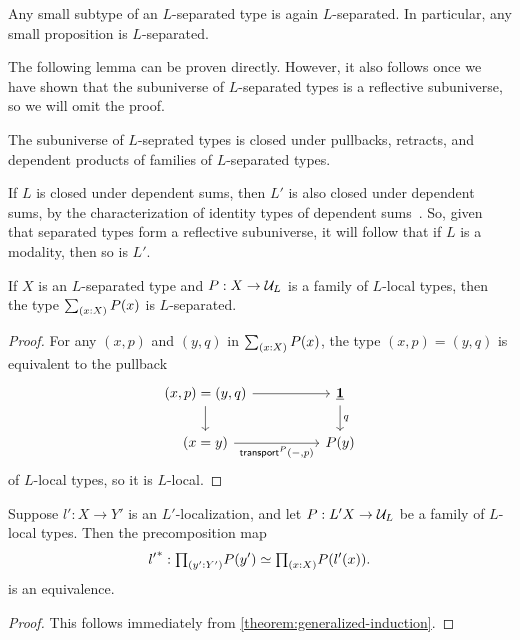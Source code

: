 \begin{lem}
Any small subtype of an $L$-separated type is again $L$-separated. In particular, any small proposition is $L$-separated.
\end{lem}

The following lemma can be proven directly. However, it also follows once we have shown that the subuniverse of $L$-separated types is a reflective subuniverse, so we will omit the proof.

\begin{lem}
The subuniverse of $L$-seprated types is closed under pullbacks, retracts, and dependent products of families of $L$-separated types.
\end{lem}

\begin{rmk}
If $L$ is closed under dependent sums, then $L'$ is also closed under dependent sums,
    by the characterization of identity types of dependent sums~\cite[Theorem~2.7.2]{hottbook}.
    So, given that separated types form a reflective subuniverse, it will follow that if $L$ is a modality,
    then so is $L'$.
\end{rmk}

\begin{prp}\label{lemma:separatedpluslocalisseparated}
If $X$ is an $L$-separated type and $P:X\to \mathcal{U}_L$ is a family of $L$-local types, then the type
$\sm{x:X}P(x)$ is $L$-separated.
\end{prp}

\begin{proof}
For any $(x,p)$ and $(y,q)$ in $\sm{x:X}P(x)$, the type $(x,p)=(y,q)$ is equivalent to the pullback
\[
  \begin{tikzcd}[column sep=huge]
    (x,p)=(y,q) \arrow[r] \arrow[d] & \unit \arrow[d,"q"] \\
    (x=y) \arrow[r,swap,"\transfib{P}{-}{p}"] & P(y)
  \end{tikzcd}
\]
of $L$-local types, so it is $L$-local. 
\end{proof}

\begin{cor}\label{proposition:inductionLseparated}
Suppose $l':X\to Y'$ is an $L'$-localization, and let $P:L'X \to \mathcal{U}_L$ be a family of $L$-local types.
Then the precomposition map
\[
    \precomp{l'}: \prd{y':Y'} P(y') \simeq \prd{x : X} P(l'(x)).
\]
is an equivalence.
\end{cor}

\begin{proof}
This follows immediately from \cref{theorem:generalized-induction}.
\end{proof}

